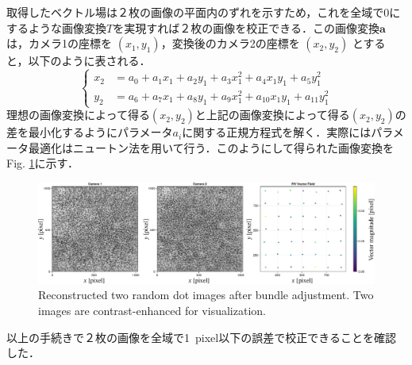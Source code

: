 取得したベクトル場は２枚の画像の平面内のずれを示すため，これを全域で0にするような画像変換$T$を実現すれば２枚の画像を校正できる．この画像変換$\bm{a}$は，カメラ1の座標を $(x_1,y_1)$，変換後のカメラ2の座標を $(x_2,y_2)$ とすると，以下のように表される．
\begin{equation}
    \left\{ 
    \begin{aligned}
        x_2 &= a_0 + a_1 x_1 + a_2 y_1 + a_3 x_1^2 + a_4 x_1 y_1 + a_5 y_1^2 \\
        y_2 &= a_6 + a_7 x_1 + a_8 y_1 + a_9 x_1^2 + a_{10} x_1 y_1 + a_{11} y_1^2
    \end{aligned}
    \right.
    \label{eq:bundle}
\end{equation}
理想の画像変換によって得る$(x_2,y_2)$と上記の画像変換によって得る$(x_2,y_2)$の差を最小化するようにパラメータ$a_i$に関する正規方程式を解く．実際にはパラメータ最適化はニュートン法を用いて行う．このようにして得られた画像変換をFig. \ref{fig:afterbundle}に示す．
\begin{figure}[H]
    \centering
    \includegraphics[width=0.98\linewidth]{./Figure/3_Methods/afterbundle.pdf}
    \caption{Reconstructed two random dot images after bundle adjustment. Two images are contrast-enhanced for visualization.}
    \label{fig:afterbundle}
\end{figure}
以上の手続きで２枚の画像を全域で\SI{1}{pixel}以下の誤差で校正できることを確認した．